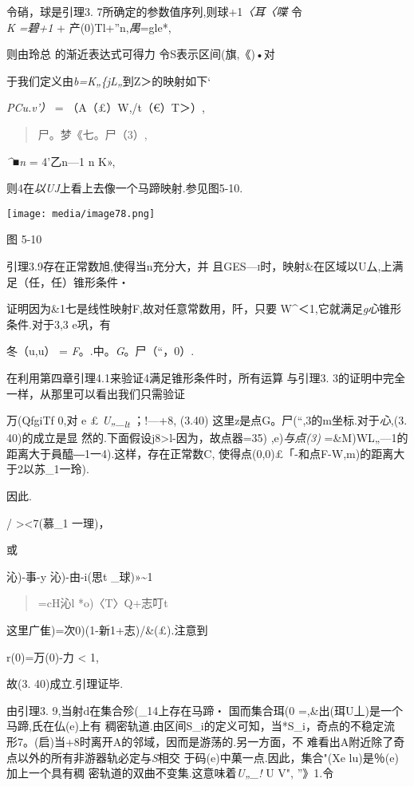 \documentclass{article}
\begin{document}
令硝，球是引理3. 7所确定的参数值序列,则球+1\emph{〈耳〈喋} 令\\
\emph{K =碧+1} + 产(0)Tl+''n,\emph{禺}=gle*,

则由玲总 的渐近表达式可得力 令S表示区间(旗,《)•对

于我们定义由\emph{b=K„\{jL„}到Z＞的映射如下`

\emph{PCu.v'）} = （A（£）W,/t（€）T＞）,

\begin{quote}
尸。梦《七。尸（3）,
\end{quote}

\emph{\^{}■n} = 4'乙n---1 n K»,

则4在\emph{以UJ}上看上去像一个马蹄映射.参见图5-10.

\texttt{[image: media/image78.png]}

图 5-10

引理3.9存在正常数旭,使得当n充分大，并
且\textsc{GES---i}时，映射\&在区域以U厶,上满足（任，任）锥形条件・

证明因为\&1七是线性映射F,故对任意常数用，阡，只要
W\^{}＜1,它就满足\emph{g心}锥形条件.对于3,3 e巩，有

冬（u,u） = \emph{F}。.中。\emph{G}。尸（``，0）.

在利用第四章引理4.1来验证4满足锥形条件时，所有运算 与引理3.
3的证明中完全一样，从那里可以看出我们只需验证

万(QfgiTf 0,对 e £ \emph{U„\_\textsubscript{lt}} ；!---+8, (3.40)
这里z是点G。尸(``,3的m坐标.对于\emph{心},(3. 40)的成立是显
然的.下面假设j8\textgreater{}l-因为，故点器=35) ,e)\emph{与点(3)}
=\&M)WL„---1的距离大于員醯―1一4).这样，存在正常数C,
使得点(0,0)£「-和点F-W,m)的距离大于2以苏\_1一玲).

因此.

/ \textgreater{}\textless{}7(慕\_1 一理)，

或

沁)-事-y 沁)-由-i(思t \_球)»\textasciitilde{}1

\begin{quote}
=cH沁l *o)〈T〉Q+志叮t
\end{quote}

这里广隹)=次0)(1-新1+志)/\&(£).注意到

r(0)=万(0)-力 \textless{} 1,

故(3. 40)成立.引理证毕.\textbar{}

由引理3. 9,当射d在集合殄(\_14上存在马蹄・ 国而集合珥(0
=,\&出(珥U丄)是一个马蹄,氏在仏(e)上有
稠密轨道.由区间S\_i的定义可知，当*S\_i，奇点的不稳定流
形7。(启)当+8时离开A的邻域，因而是游荡的.另一方面，不
难看出A附近除了奇点以外的所有非游器轨必定与\emph{S}相交
于码(e)中菓一点.因此，集合"(Xe lu)是％(e)加上一个具有稠
密轨道的双曲不变集.这意味着\emph{U„\_!} U V", ''》1.令
\end{document}
